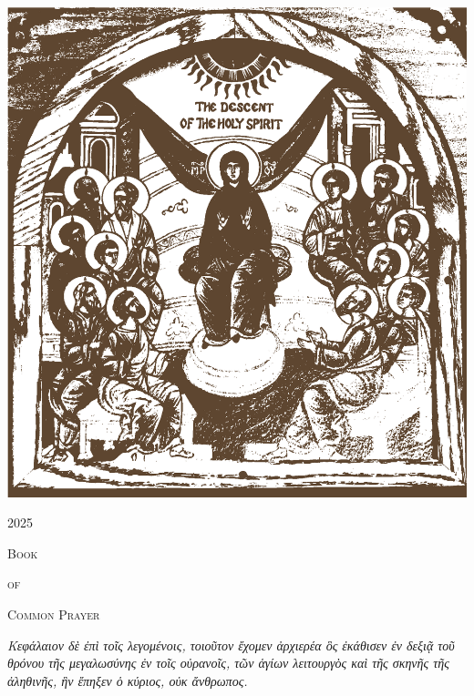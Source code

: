 \documentclass[10pt]{book}
\begin{document}
\begin{titlepage}
		\begin{center}
			\includegraphics[scale=.3]{Descent.eps}
			\par
			\vspace{1cm}
			\Huge{\scshape 2025}
			\par
			\Huge{\scshape Book}
			\par
			\Large{\scshape of}
			\par
			\Huge{\scshape Common Prayer}\\
			\par
			\vfill
			\small{\textit{Κεφάλαιον δὲ ἐπὶ τοῖς λεγομένοις, τοιοῦτον ἔχομεν ἀρχιερέα ὃς ἐκάθισεν ἐν δεξιᾷ τοῦ θρόνου τῆς μεγαλωσύνης ἐν τοῖς οὐρανοῖς, τῶν ἁγίων λειτουργὸς καὶ τῆς σκηνῆς τῆς ἀληθινῆς, ἣν ἔπηξεν ὁ κύριος, οὐκ ἄνθρωπος.}}
		\end{center}
	\end{titlepage}
\newpage
\end{document}
